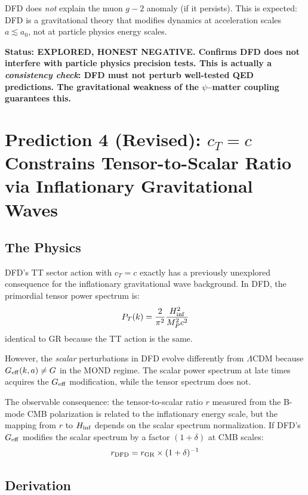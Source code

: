 \documentclass[11pt]{article}
\begin{document}
DFD does \emph{not} explain the muon $g-2$ anomaly (if it persists).
This is expected: DFD is a gravitational theory that modifies dynamics
at acceleration scales $a \lesssim a_0$, not at particle physics
energy scales.

\textbf{Status: EXPLORED, HONEST NEGATIVE.  Confirms DFD does not
interfere with particle physics precision tests.  This is actually a
\emph{consistency check}: DFD must not perturb well-tested QED
predictions.  The gravitational weakness of the $\psi$--matter
coupling guarantees this.}

\section{Prediction 4 (Revised): $c_T = c$ Constrains Tensor-to-Scalar
Ratio via Inflationary Gravitational Waves}
\label{sec:tensor-scalar}

\subsection{The Physics}

DFD's TT sector action with $c_T = c$ exactly has a previously
unexplored consequence for the inflationary gravitational wave
background.  In DFD, the primordial tensor power spectrum is:
\begin{equation}
P_T(k) = \frac{2}{\pi^2}\frac{H_{\rm inf}^2}{M_P^2 c^2}
\end{equation}
identical to GR because the TT action is the same.

However, the \emph{scalar} perturbations in DFD evolve differently
from $\Lambda$CDM because $G_{\rm eff}(k,a) \neq G$ in the
MOND regime.  The scalar power spectrum at late times acquires the
$G_{\rm eff}$ modification, while the tensor spectrum does not.

The observable consequence: the tensor-to-scalar ratio $r$ measured
from the B-mode CMB polarization is related to the inflationary energy
scale, but the mapping from $r$ to $H_{\rm inf}$ depends on the scalar
spectrum normalization.  If DFD's $G_{\rm eff}$ modifies the scalar
spectrum by a factor $(1 + \delta)$ at CMB scales:
\begin{equation}
r_{\rm DFD} = r_{\rm GR} \times (1 + \delta)^{-1}
\end{equation}

\subsection{Derivation}
\end{document}
